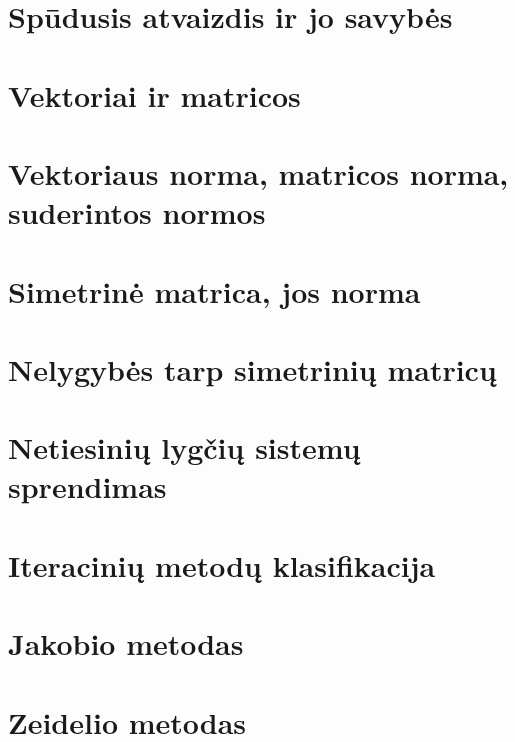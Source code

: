 \section{Spūdusis atvaizdis ir jo savybės}
\cite[43-44]{textbook}
\section{Vektoriai ir matricos}
\section{Vektoriaus norma, matricos norma, suderintos normos}
\cite[43-44]{textbook}
\cite[104]{textbook}
\section{Simetrinė matrica, jos norma}
\section{Nelygybės tarp simetrinių matricų}
\cite[99]{textbook}
\section{Netiesinių lygčių sistemų sprendimas}
\cite[43-48]{textbook}

\section{Iteracinių metodų klasifikacija}
\cite[104]{textbook}
\section{Jakobio metodas}
\cite[88-93]{textbook}
\section{Zeidelio metodas}
\cite[93-96]{textbook}
